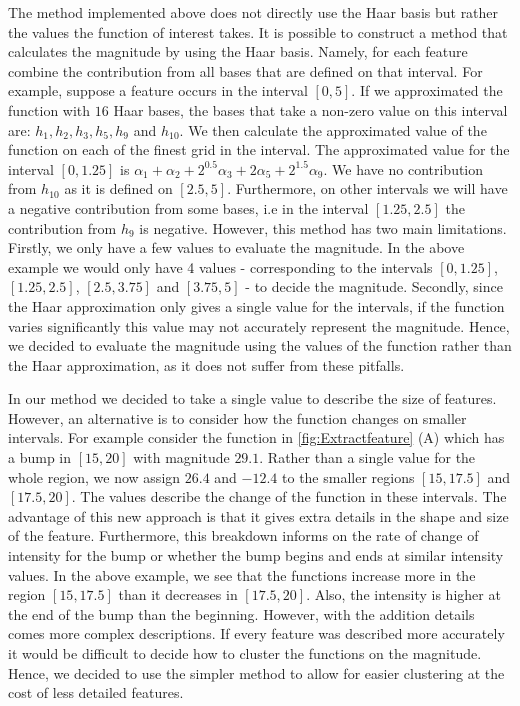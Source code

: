 \documentclass[12pt]{book} %
\begin{document}
The method implemented above does not directly use the Haar basis but rather the values the function of interest takes. It is possible to construct a method that calculates the magnitude by using the Haar basis. Namely, for each feature combine the contribution from all bases that are defined on that interval. For example, suppose a feature occurs in the interval $[0,5]$. If we approximated the function with $16$ Haar bases, the bases that take a non-zero value on this interval are: $h_1,h_2,h_3,h_5,h_9$ and $h_{10}$. We then calculate the approximated value of the function on each of the finest grid in the interval. The approximated value for the interval $[0,1.25]$ is $\alpha_1 + \alpha_2 + 2^{0.5}\alpha_3  + 2\alpha_5  + 2^{1.5}\alpha_9$. We have no contribution from $h_{10}$ as it is defined on $[2.5,5]$. Furthermore, on other intervals we will have a negative contribution from some bases, i.e in the interval $[1.25,2.5]$ the contribution from $h_9$ is negative. However, this method has two main limitations. Firstly, we only have a few values to evaluate the magnitude. In the above example we would only have 4 values - corresponding to the intervals $[0,1.25]$, $[1.25,2.5]$, $[2.5,3.75]$ and $[3.75,5]$ - to decide the magnitude. Secondly, since the Haar approximation only gives a single value for the intervals, if the function varies significantly this value may not accurately represent the magnitude. Hence, we decided to evaluate the magnitude using the values of the function rather than the Haar approximation, as it does not suffer from these pitfalls. 

In our method we decided to take a single value to describe the size of features. However, an alternative is to consider how the function changes on smaller intervals. For example consider the function in \ref{fig:Extractfeature} (A) which has a bump in $[15,20]$ with magnitude $29.1$. Rather than a single value for the whole region, we now assign $26.4$ and $-12.4$ to the smaller regions $[15,17.5]$ and $[17.5,20]$. The values describe the change of the function in these intervals. The advantage of this new approach is that it gives extra details in the shape and size of the feature. Furthermore, this breakdown informs on the rate of change of intensity for the bump or whether the bump begins and ends at similar intensity values. In the above example, we see that the functions increase more in the region $[15,17.5]$ than it decreases in $[17.5,20]$. Also, the intensity is higher at the end of the bump than the beginning. However, with the addition details comes more complex descriptions. If every feature was described more accurately it would be difficult to decide how to cluster the functions on the magnitude.  Hence, we decided to use the simpler method to allow for easier clustering at the cost of less detailed features.
 
\end{document}
